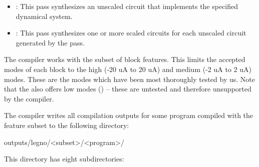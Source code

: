 \begin{itemize}
  \item\lgraph: This pass synthesizes an unscaled circuit that implements the
    specified dynamical system.
  \item\lscale : This pass synthesizes one or more scaled circuits for each
    unscaled circuit generated by the \lgraph pass.
  \end{itemize}


The \legno compiler works with the  subset of block features. This
limits the accepted modes of each block to the high (-20 uA to 20 uA) and medium
(-2 uA to 2 uA) modes. These are the modes which have been most thoroughly
tested by us. Note that the \hcdc also offers low modes () --
these are untested and therefore unsupported by the compiler.

The \legno compiler writes all compilation outputs for some program
 compiled with the feature subset  to the following
directory:

\begin{snippet}
  outputs/legno/<subset>/<program>/
\end{snippet}

This directory has eight subdirectories:

